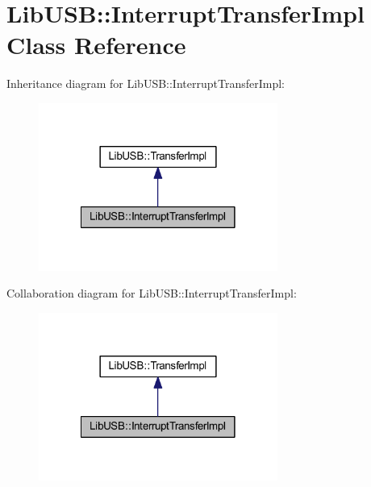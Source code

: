 \hypertarget{class_lib_u_s_b_1_1_interrupt_transfer_impl}{\section{Lib\-U\-S\-B\-:\-:Interrupt\-Transfer\-Impl Class Reference}
\label{class_lib_u_s_b_1_1_interrupt_transfer_impl}
}


Inheritance diagram for Lib\-U\-S\-B\-:\-:Interrupt\-Transfer\-Impl\-:
\nopagebreak
\begin{figure}[H]
\begin{center}
\leavevmode
\includegraphics[width=222pt]{class_lib_u_s_b_1_1_interrupt_transfer_impl__inherit__graph}
\end{center}
\end{figure}


Collaboration diagram for Lib\-U\-S\-B\-:\-:Interrupt\-Transfer\-Impl\-:
\nopagebreak
\begin{figure}[H]
\begin{center}
\leavevmode
\includegraphics[width=222pt]{class_lib_u_s_b_1_1_interrupt_transfer_impl__coll__graph}
\end{center}
\end{figure}
